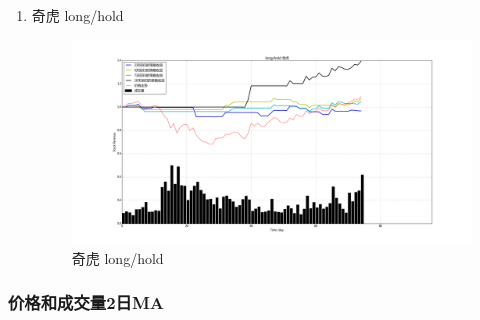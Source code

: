 \documentclass[12pt,a4paper]{article}
\begin{document}
\begin{enumerate}[1.]
\item 奇虎 long/hold

\begin{figure}[H]
	\centering
	\includegraphics[width=1.0\textwidth]{img_r_1/hold/qihu.png}
	\caption{奇虎 long/hold}
\end{figure}

\end{enumerate}


\subsubsection{价格和成交量2日MA}
\end{document}
